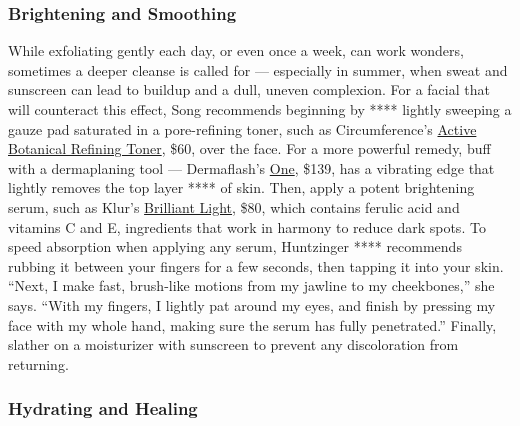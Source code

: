 \hypertarget{brightening-and-smoothing}{%
\subsubsection{\texorpdfstring{\textbf{Brightening and
Smoothing}}{Brightening and Smoothing}}\label{brightening-and-smoothing}}

While exfoliating gently each day, or even once a week, can work
wonders, sometimes a deeper cleanse is called for --- especially in
summer, when sweat and sunscreen can lead to buildup and a dull, uneven
complexion. For a facial that will counteract this effect, Song
recommends beginning by **** lightly sweeping a gauze pad saturated in a
pore-refining toner, such as Circumference's
\href{https://www.circumferencenyc.com/collections/shop-skincare/products/active-botanical-refining-toner}{Active
Botanical Refining Toner}, \$60, over the face. For a more powerful
remedy, buff with a dermaplaning tool --- Dermaflash's
\href{https://dermaflash.com/products/one-device?variant=32635171045516}{One},
\$139, has a vibrating edge that lightly removes the top layer **** of
skin. Then, apply a potent brightening serum, such as Klur's
\href{https://klur.co/collections/shop/products/brilliant-light}{Brilliant
Light}, \$80, which contains ferulic acid and vitamins C and E,
ingredients that work in harmony to reduce dark spots. To speed
absorption when applying any serum, Huntzinger **** recommends rubbing
it between your fingers for a few seconds, then tapping it into your
skin. ``Next, I make fast, brush-like motions from my jawline to my
cheekbones,'' she says. ``With my fingers, I lightly pat around my eyes,
and finish by pressing my face with my whole hand, making sure the serum
has fully penetrated.'' Finally, slather on a moisturizer with sunscreen
to prevent any discoloration from returning.

\hypertarget{hydrating-and-healing}{%
\subsubsection{\texorpdfstring{\textbf{Hydrating and
Healing}}{Hydrating and Healing}}\label{hydrating-and-healing}}

